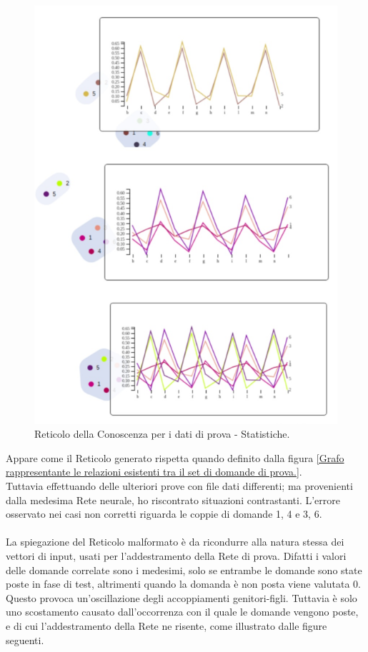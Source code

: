 \begin{figure}[H]
\centering
	\includegraphics[width=0.50\linewidth]{./image/collage_reticolo-general-statistic.png}
	\caption{Reticolo della Conoscenza per i dati di prova - Statistiche.}
	\label{Reticolo della Conoscenza per i dati di prova - Statistiche.}
\end{figure}
\noindent
Appare come il Reticolo generato rispetta quando definito dalla figura \ref{Grafo rappresentante le relazioni esistenti tra il set di domande di prova.}.\\
Tuttavia effettuando delle ulteriori prove con file dati differenti; ma provenienti dalla medesima Rete neurale, ho riscontrato situazioni contrastanti. L'errore osservato nei casi non corretti riguarda le coppie di domande 1, 4 e 3, 6.\\\\
La spiegazione del Reticolo malformato \`e da ricondurre alla natura stessa dei vettori di input, usati per l'addestramento della Rete di prova. Difatti i valori delle domande correlate sono i medesimi, solo se entrambe le domande sono state poste in fase di test, altrimenti quando la domanda \`e non posta viene valutata 0. Questo provoca un'oscillazione degli accoppiamenti genitori-figli. Tuttavia \`e solo uno scostamento causato dall'occorrenza  con il quale le domande vengono poste, e di cui l'addestramento della Rete ne risente, come illustrato dalle figure seguenti.
